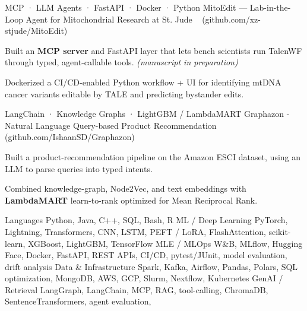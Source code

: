 \documentclass[11pt, a4paper]{awesome-cv}
\begin{document}
\begin{cventries}
  \cventry
    {MCP · LLM Agents · FastAPI · Docker · Python}
    {MitoEdit — Lab-in-the-Loop Agent for Mitochondrial Research at St. Jude}
    {~}
    {(github.com/xz-stjude/MitoEdit)}
    {
        \begin{cvitems}
            \item {Built an \textbf{MCP server} and FastAPI layer that lets bench scientists run TalenWF through typed, agent-callable tools. \textit{(manuscript in preparation)}}
            \item {Dockerized a CI/CD-enabled Python workflow + UI for identifying mtDNA cancer variants editable by TALE and predicting bystander edits.}
        \end{cvitems}
    }
    \cventry
    {LangChain · Knowledge Graphs · LightGBM / LambdaMART}
    {Graphazon - Natural Language Query-based Product Recommendation}
    {~}
    {(github.com/IshaanSD/Graphazon)}
    {
      \begin{cvitems}
        \item {Built a product-recommendation pipeline on the Amazon ESCI dataset, using an LLM to parse queries into typed intents.}
        \item {Combined knowledge-graph, Node2Vec, and text embeddings with \textbf{LambdaMART} learn-to-rank optimized for Mean Reciprocal Rank.}
      \end{cvitems}
    }
\end{cventries}

\begin{cvskills}
  \cvskill
    {Languages}
    {Python, Java, C++, SQL, Bash, R}
  \cvskill
    {ML / Deep Learning}
    {PyTorch, Lightning, Transformers, CNN, LSTM, PEFT / LoRA, FlashAttention, scikit-learn, XGBoost, LightGBM, TensorFlow}
  \cvskill
    {MLE / MLOps}
    {W\&B, MLflow, Hugging Face, Docker, FastAPI, REST APIs, CI/CD, pytest/JUnit, model evaluation, drift analysis}
  \cvskill
    {Data \& Infrastructure}
    {Spark, Kafka, Airflow, Pandas, Polars, SQL optimization, MongoDB, AWS, GCP, Slurm, Nextflow, Kubernetes}
  \cvskill
    {GenAI / Retrieval}
    {LangGraph, LangChain, MCP, RAG, tool-calling, ChromaDB, SentenceTransformers, agent evaluation, }
\end{cvskills}
\end{document}
